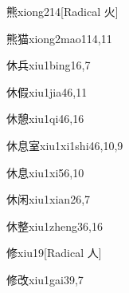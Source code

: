 \begin{verbete}{熊}{xiong2}{14}[Radical 火]
\end{verbete}

\begin{verbete}{熊猫}{xiong2mao1}{14,11}
\end{verbete}

\begin{verbete}{休兵}{xiu1bing1}{6,7}
\end{verbete}

\begin{verbete}{休假}{xiu1jia4}{6,11}
\end{verbete}

\begin{verbete}{休憩}{xiu1qi4}{6,16}
\end{verbete}

\begin{verbete}{休息室}{xiu1xi1shi4}{6,10,9}
\end{verbete}

\begin{verbete}{休息}{xiu1xi5}{6,10}
\end{verbete}

\begin{verbete}{休闲}{xiu1xian2}{6,7}
\end{verbete}

\begin{verbete}{休整}{xiu1zheng3}{6,16}
\end{verbete}

\begin{verbete}{修}{xiu1}{9}[Radical 人]
\end{verbete}

\begin{verbete}{修改}{xiu1gai3}{9,7}
\end{verbete}

